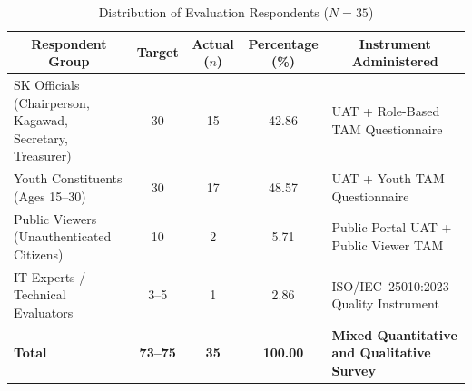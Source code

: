\begin{table}[H]
\centering
\small
\caption{Distribution of Evaluation Respondents ($N = 35$)}
\label{tab:distribution_evaluation_respondents}
\begin{tabular}{|p{3.5cm}|c|c|c|p{3.6cm}|}
\hline
\multicolumn{1}{|c|}{\textbf{Respondent Group}} & \textbf{Target} & \textbf{Actual ($n$)} & \textbf{Percentage (\%)} & \multicolumn{1}{c|}{\textbf{Instrument Administered}} \\ \hline
SK Officials (Chairperson, Kagawad, Secretary, Treasurer) & 30 & 15 & 42.86 & UAT + Role-Based TAM Questionnaire \\ \hline
Youth Constituents (Ages 15--30) & 30 & 17 & 48.57 & UAT + Youth TAM Questionnaire \\ \hline
Public Viewers (Unauthenticated Citizens) & 10 & 2 & 5.71 & Public Portal UAT + Public Viewer TAM \\ \hline
IT Experts / Technical Evaluators & 3--5 & 1 & 2.86 & ISO/IEC~25010:2023 Quality Instrument \\ \hline
\textbf{Total} & \textbf{73--75} & \textbf{35} & \textbf{100.00} & \textbf{Mixed Quantitative and Qualitative Survey} \\ \hline
\end{tabular}
\end{table}
\vspace{5mm}

